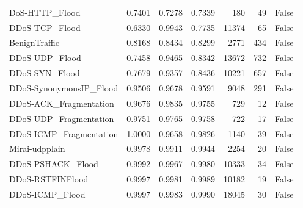 \begin{table}[t]
{\begin{tabular}{lrrrrrr}
DoS-HTTP\_Flood & 0.7401 & 0.7278 & 0.7339 & 180 & 49 & False \\
DDoS-TCP\_Flood & 0.6330 & 0.9943 & 0.7735 & 11374 & 65 & False \\
BenignTraffic & 0.8168 & 0.8434 & 0.8299 & 2771 & 434 & False \\
DDoS-UDP\_Flood & 0.7458 & 0.9465 & 0.8342 & 13672 & 732 & False \\
DDoS-SYN\_Flood & 0.7679 & 0.9357 & 0.8436 & 10221 & 657 & False \\
DDoS-SynonymousIP\_Flood & 0.9506 & 0.9678 & 0.9591 & 9048 & 291 & False \\
DDoS-ACK\_Fragmentation & 0.9676 & 0.9835 & 0.9755 & 729 & 12 & False \\
DDoS-UDP\_Fragmentation & 0.9751 & 0.9765 & 0.9758 & 722 & 17 & False \\
DDoS-ICMP\_Fragmentation & 1.0000 & 0.9658 & 0.9826 & 1140 & 39 & False \\
Mirai-udpplain & 0.9978 & 0.9911 & 0.9944 & 2254 & 20 & False \\
DDoS-PSHACK\_Flood & 0.9992 & 0.9967 & 0.9980 & 10333 & 34 & False \\
DDoS-RSTFINFlood & 0.9997 & 0.9981 & 0.9989 & 10182 & 19 & False \\
DDoS-ICMP\_Flood & 0.9997 & 0.9983 & 0.9990 & 18045 & 30 & False \\
\bottomrule
\end{tabular}
}
\end{table}
